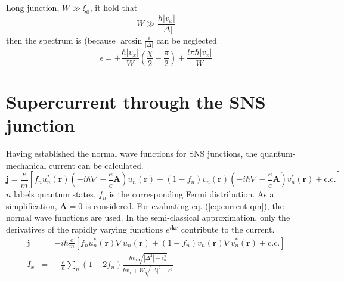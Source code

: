 Long junction, $W \gg \xi_0$, it hold that 
\begin{equation}
W \gg \frac{\hbar |v_x|}{|\Delta|} 
\end{equation} 
then the spectrum is (because $\arcsin \frac{\epsilon}{|\Delta|}$ can be neglected
\begin{equation}
\epsilon = \pm \frac{\hbar |v_x|}{W}\left(\frac{\chi}{2} - \frac{\pi}{2} \right) + \frac{l \pi \hbar |v_x|}{W} 
\end{equation}

\section{Supercurrent through the SNS junction}
Having established the normal wave functions for SNS junctions, the quantum-mechanical current can be calculated.
\begin{equation}
\mathbf{j} = \frac{e}{m} \left[ f_n u_n^* \left( \mathbf{r} \right) \left( - i \hbar \nabla - \frac{e}{c} \mathbf{A} \right) u_n\left( \mathbf{r} \right) + \left(1-f_n\right) v_n\left( \mathbf{r} \right) \left( -i \hbar \nabla - \frac{e}{c} \mathbf{A} \right) v_n^*\left( \mathbf{r} \right) + \text{c.c.} \right] \label{eq:current-qm}
\end{equation}
$n$ labels quantum states, $f_n$ is the corresponding Fermi distribution.
As a simplification, $\mathbf{A} = 0$ is considered. For evaluating eq. (\ref{eq:current-qm}), the normal wave functions are used. In the semi-classical approximation, only the derivatives of the rapidly varying functions $e^{i\mathbf{k r}}$ contribute to the current.
\begin{eqnarray}
\mathbf{j} &=& - i \hbar  \frac{e}{m} \left[ f_n u_n^* \left( \mathbf{r} \right) \nabla  u_n \left( \mathbf{r} \right) + \left(1-f_n\right) v_n\left( \mathbf{r} \right) \nabla v_n^*\left( \mathbf{r} \right) + \text{c.c.} \right]\\
I_x &=& - \frac{e}{\hbar} \sum_n \left(1- 2 f_n \right) \frac{\hbar v_x \sqrt{|\Delta^2| - \epsilon_n^2}}{\hbar v_x + W \sqrt{|\Delta|^2 -\epsilon^2}}
\end{eqnarray}

